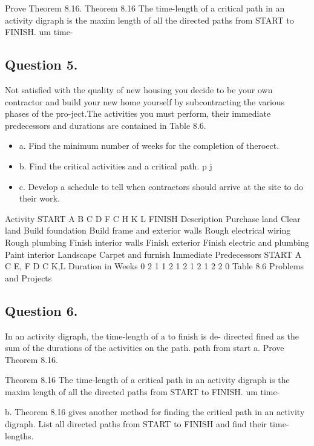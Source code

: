 \documentclass{article}
\begin{document}
Prove Theorem 8.16. 
Theorem 8.16 The time-length of a critical path in an activity digraph is the maxim length of all the directed paths from START to FINISH. um time- 

\subsection{ Question 5. }
Not satisfied with the quality of new housing you decide to be your own contractor 
and build your new home yourself by subcontracting the various phases of the pro-ject.The activities you must perform, their immediate predecessors and durations 
are contained in Table 8.6. 
\begin{itemize}
\item a. Find the minimum number of weeks for the completion of theroect. 
\item b. Find the critical activities and a critical path. p j 
\item c. Develop a schedule to tell when contractors should arrive at the site to do their 
work. 
\end{itemize}
Activity START A B C D F C H K L FINISH Description Purchase land Clear land Build foundation Build frame and exterior walls Rough electrical wiring Rough plumbing Finish interior walls Finish exterior Finish electric and plumbing Paint interior Landscape Carpet and furnish Immediate Predecessors START A C E, F D C K,L Duration in Weeks 0 2 1 1 2 1 2 1 2 1 2 2 0 Table 8.6 
Problems and Projects 
\subsection{Question 6.} In an activity digraph, the time-length of a to finish is de-
directed 
fined as the sum of the durations of the activities on the path. 
path from start 
a. Prove Theorem 8.16. 
\begin{framed}
Theorem 8.16 
The time-length of a critical path in an activity digraph is the maxim 
length of all the directed paths from START to FINISH. um time- 
\end{framed}



b. Theorem 8.16 gives another method for finding the critical path in an activity digraph. List all directed paths from START to FINISH and find their time-lengths. 
\end{document}
